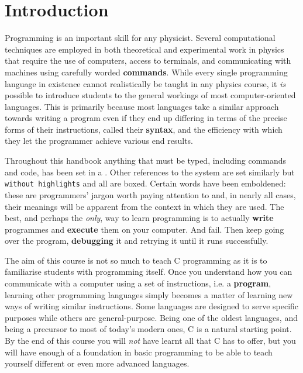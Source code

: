 \documentclass[11pt,oneside]{article}
\begin{document}
\section{Introduction}

Programming is an important skill for any physicist. Several computational techniques are employed in both theoretical and experimental work in physics that require the use of computers, access to terminals, and communicating with machines using carefully worded \textbf{commands}. While every single programming language in existence cannot realistically be taught in any physics course, it \textit{is} possible to introduce students to the general workings of most computer-oriented languages. This is primarily because most languages take a similar approach towards writing a program even if they end up differing in terms of the precise forms of their instructions, called their \textbf{syntax}, and the efficiency with which they let the programmer achieve various end results.

Throughout this handbook anything that must be typed, including commands and code, has been set in a . Other references to the system are set similarly but \verb+without highlights+ and all  are boxed. Certain words have been emboldened: these are programmers' jargon worth paying attention to and, in nearly all cases, their meanings will be apparent from the context in which they are used. The best, and perhaps the \textit{only}, way to learn programming is to actually \textbf{write} programmes and \textbf{execute} them on your computer. And fail. Then keep going over the program, \textbf{debugging} it and retrying it until it runs successfully.

The aim of this course is not so much to teach C programming as it is to familiarise students with programming itself. Once you understand how you can communicate with a computer using a set of instructions, i.e. a \textbf{program}, learning other programming languages simply becomes a matter of learning new ways of writing similar instructions. Some languages are designed to serve specific purposes while others are general-purpose. Being one of the oldest languages, and being a precursor to most of today's modern ones, C is a natural starting point. By the end of this course you will \textit{not} have learnt all that C has to offer, but you will have enough of a foundation in basic programming to be able to teach yourself different or even more advanced languages.
\end{document}
